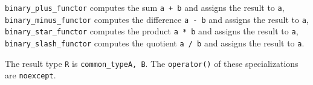 \texttt{binary\_plus\_functor} computes the sum \texttt{a + b} and assigns the result to \texttt{a},
\texttt{binary\_minus\_functor} computes the difference \texttt{a - b} and assigns the result to \texttt{a},
\texttt{binary\_star\_functor} computes the product \texttt{a * b} and assigns the result to \texttt{a},
\texttt{binary\_slash\_functor} computes the quotient \texttt{a / b} and assigns the result to \texttt{a}.\newline

The result type \texttt{R} is \texttt{common\_type\textlangle A, B\textrangle}.
The \texttt{operator()} of these specializations are \texttt{noexcept}.
